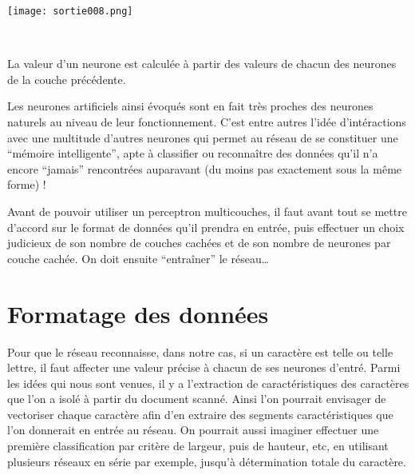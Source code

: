 \documentclass[a4paper,10pt]{report}
\begin{document}

\begin{center}
	
	\texttt{[image: sortie008.png]}\\
	\caption{\emph{Perceptron \`a une sortie}}\\
\end{center}





La valeur d'un neurone est calcul\'ee \`a partir des valeurs de chacun
des neurones de la couche pr\'ec\'edente.

Les neurones artificiels ainsi \'evoqu\'es sont en fait tr\`es proches
des neurones naturels au niveau de leur fonctionnement. C'est entre
autres l'id\'ee d'int\'eractions avec une multitude d'autres neurones
qui permet au r\'eseau de se constituer une ``m\'emoire intelligente'',
apte \`a classifier ou reconna\^itre des donn\'ees qu'il n'a encore
``jamais'' rencontr\'ees auparavant (du moins pas exactement sous la
même forme) !

Avant de pouvoir utiliser un perceptron multicouches, il faut avant tout se mettre d'accord sur le
format de donn\'ees qu'il prendra en entr\'ee, puis effectuer un choix
judicieux de son nombre de couches cach\'ees et de son nombre de neurones
par couche cach\'ee. On doit ensuite ``entra\^iner'' le r\'eseau\ldots


\section{Formatage des donn\'ees} %
\label{subsec:formatage_des_donnees}

Pour que le r\'eseau reconnaisse, dans notre cas, si un caract\`ere est
telle ou telle lettre, il faut affecter une valeur pr\'ecise à chacun de
ses neurones d'entr\'e.
Parmi les id\'ees qui nous sont venues, il y a l'extraction de
caract\'eristiques des caract\`eres que l'on a isol\'e \`a partir du document
scann\'e. Ainsi l'on pourrait envisager de vectoriser chaque caract\`ere
afin d'en extraire des segments caract\'eristiques que l'on donnerait en
entr\'ee au r\'eseau. On pourrait aussi imaginer effectuer une premi\`ere
classification par crit\`ere de largeur, puis de hauteur, etc, en utilisant
plusieurs r\'eseaux en s\'erie par exemple, jusqu'\`a d\'etermination totale du
caract\`ere.
\end{document}
